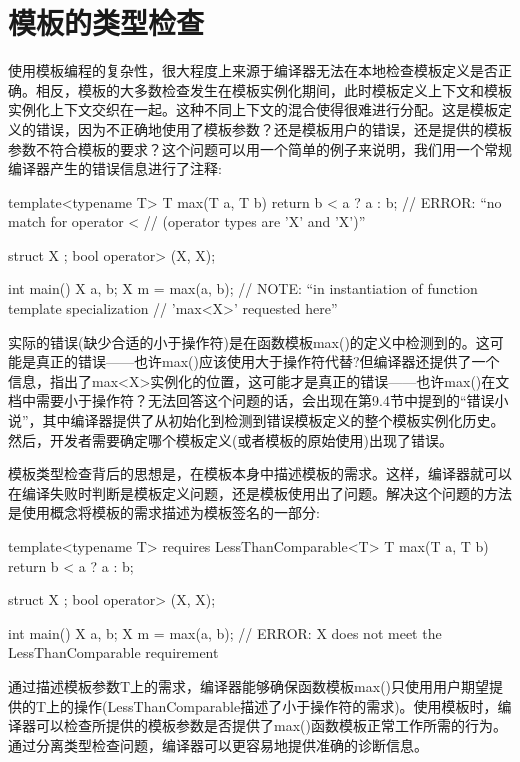 \section{模板的类型检查}

使用模板编程的复杂性，很大程度上来源于编译器无法在本地检查模板定义是否正确。相反，模板的大多数检查发生在模板实例化期间，此时模板定义上下文和模板实例化上下文交织在一起。这种不同上下文的混合使得很难进行分配。这是模板定义的错误，因为不正确地使用了模板参数？还是模板用户的错误，还是提供的模板参数不符合模板的要求？这个问题可以用一个简单的例子来说明，我们用一个常规编译器产生的错误信息进行了注释:

\begin{cpp}
template<typename T>
T max(T a, T b)
{
	return b < a ? a : b; // ERROR: “no match for operator <
	// (operator types are 'X' and 'X')”
}

struct X {
};
bool operator> (X, X);

int main()
{
	X a, b;
	X m = max(a, b); // NOTE: “in instantiation of function template specialization
					// 'max<X>' requested here”
}
\end{cpp}

实际的错误(缺少合适的小于操作符)是在函数模板max()的定义中检测到的。这可能是真正的错误——也许max()应该使用大于操作符代替?但编译器还提供了一个信息，指出了max<X>实例化的位置，这可能才是真正的错误——也许max()在文档中需要小于操作符？无法回答这个问题的话，会出现在第9.4节中提到的“错误小说”，其中编译器提供了从初始化到检测到错误模板定义的整个模板实例化历史。然后，开发者需要确定哪个模板定义(或者模板的原始使用)出现了错误。

模板类型检查背后的思想是，在模板本身中描述模板的需求。这样，编译器就可以在编译失败时判断是模板定义问题，还是模板使用出了问题。解决这个问题的方法是使用概念将模板的需求描述为模板签名的一部分:

\begin{cpp}
template<typename T> requires LessThanComparable<T>
T max(T a, T b)
{
	return b < a ? a : b;
}

struct X { };
bool operator> (X, X);

int main()
{
	X a, b;
	X m = max(a, b); // ERROR: X does not meet the LessThanComparable requirement
}
\end{cpp}

通过描述模板参数T上的需求，编译器能够确保函数模板max()只使用用户期望提供的T上的操作(LessThanComparable描述了小于操作符的需求)。使用模板时，编译器可以检查所提供的模板参数是否提供了max()函数模板正常工作所需的行为。通过分离类型检查问题，编译器可以更容易地提供准确的诊断信息。

